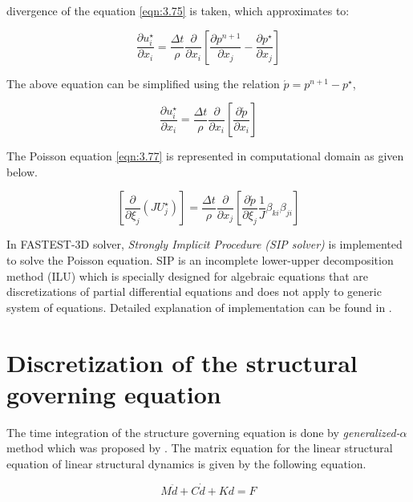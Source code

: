 divergence of the equation \ref{eqn:3.75} is taken, which approximates to:

\begin{equation}
\frac{\partial u_i^{\star}}{\partial x_i} = \frac{\Delta t}{\rho} \frac{\partial}{\partial x_i} \left[ \frac{\partial p^{n+1}}{\partial x_j} - \frac{\partial p^{\star}}{\partial x_j} \right]
\label{eqn:3.76}
\end{equation}

The above equation can be simplified using the relation $\acute{p} = p^{n+1} - p^{\star}$,

\begin{equation}
\frac{\partial u_i^{\star}}{\partial x_i} = \frac{\Delta t}{\rho} \frac{\partial}{\partial x_i} \left[ \frac{\partial \acute{p}}{\partial x_i} \right]
\label{eqn:3.77}
\end{equation}

The Poisson equation \ref{eqn:3.77} is represented in computational domain as given below.

\begin{equation}
\left[ \frac{\partial}{\partial {\xi_j}} \left(J U_j^{\star} \right) \right] = \frac{\Delta t}{\rho} \frac{\partial}{\partial {x_j}} \left[ \frac{\partial \acute{p}}{\partial {\xi_j}} \frac{1}{J} \beta_{ki} \beta_{ji} \right] 
\label{eqn:3.78}
\end{equation}

In FASTEST-3D solver, \textit{Strongly Implicit Procedure (SIP solver)} is implemented to solve the Poisson equation. SIP is an incomplete lower-upper decomposition method (ILU) which is specially designed for algebraic equations that are discretizations of partial differential equations and does not apply to generic system of equations. Detailed explanation of implementation can be found in \citet{munsch2015entwicklung}. 

\section{Discretization of the structural governing equation}

The time integration of the structure governing equation is done by \textit{generalized-$\alpha$} method which was proposed by \citet{chung1993time}. The matrix equation for the linear structural equation of linear structural dynamics is given by the following equation.

\begin{equation}
M\ddot{d} + C\dot{d} + Kd = F
\label{eqn:3.79}
\end{equation}

